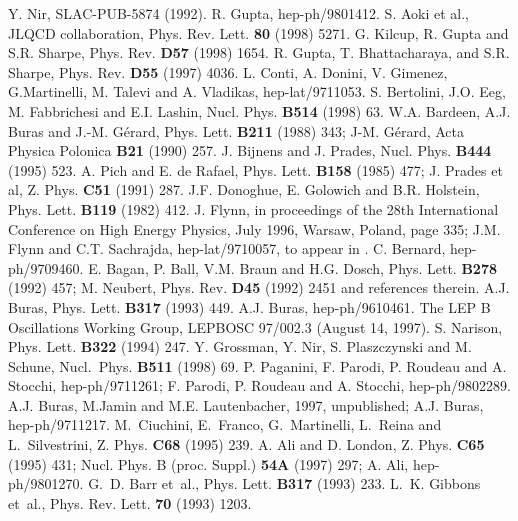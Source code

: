 \begin{thebibliography}{999}
Y. Nir, SLAC-PUB-5874 (1992).
R. Gupta, hep-ph/9801412.
S. Aoki et al., JLQCD collaboration, 
{ Phys. Rev. Lett.} {\bf 80} (1998) 5271. 
G. Kilcup, R. Gupta and S.R. Sharpe, 
{ Phys. Rev.} {\bf D57} (1998) 1654.
R. Gupta, T. Bhattacharaya, and S.R. Sharpe, 
{ Phys. Rev.} {\bf D55} (1997) 4036.
L. Conti, A. Donini, V. Gimenez, G.Martinelli, M. Talevi and
A. Vladikas, hep-lat/9711053.
S. Bertolini, J.O. Eeg, M. Fabbrichesi and E.I. Lashin,
{ Nucl. Phys.} {\bf B514} (1998) 63.
{W.A. Bardeen, A.J. Buras and J.-M. G\'erard,}
{ Phys. Lett.} {\bf B211} (1988) 343;
 {J-M. G\'erard,} { Acta Physica Polonica} {\bf B21} (1990) 257. 
{ J. Bijnens and J. Prades,} { Nucl. Phys.} {\bf B444} (1995) 523. 
{ A. Pich and E. de Rafael,} { Phys. Lett.} {\bf B158} (1985) 477;
{ J. Prades} {  et al,} { Z. Phys.}  {\bf C51} (1991) 287.
{ J.F. Donoghue, E. Golowich and B.R. Holstein,}
{ Phys. Lett.} {\bf B119} (1982) 412.
{ J. Flynn}, in proceedings of the 28th International Conference
on High Energy Physics, July 1996, Warsaw, Poland, page 335; 
 J.M. Flynn and C.T. Sachrajda, hep-lat/9710057, 
to appear in \cite{HFII}.
C. Bernard, hep-ph/9709460.
{ E. Bagan, P. Ball, V.M. Braun and H.G. Dosch},
{ Phys. Lett.} {\bf B278} (1992) 457;
{ M. Neubert}, { Phys. Rev.} {\bf D45} (1992) 2451 and references
therein.
A.J. Buras, { Phys. Lett.} {\bf B317} (1993) 449.
A.J. Buras, hep-ph/9610461.
The LEP B Oscillations Working Group, LEPBOSC 97/002.3 (August 14, 1997).
{S. Narison,}
{ Phys. Lett.} {\bf B322} (1994) 247.
Y. Grossman, Y. Nir, S. Plaszczynski and M. Schune,
{ Nucl.~Phys.} {\bf B511} (1998) 69.
P. Paganini, F. Parodi, P. Roudeau and A. Stocchi, hep-ph/9711261;
F. Parodi, P. Roudeau and A. Stocchi, hep-ph/9802289.
{ A.J. Buras, M.Jamin and M.E. Lautenbacher,} 1997, unpublished;
A.J. Buras, hep-ph/9711217.
{ M.~Ciuchini}, { E.~Franco}, { G.~Martinelli}, {L.~Reina
 and   L.~Silvestrini},
 { Z. Phys.} {\bf C68} (1995) 239.
{ A. Ali and D. London,}
{ Z. Phys.} {\bf C65} (1995) 431; 
{ Nucl. Phys. B} (proc. Suppl.) {\bf 54A} (1997) 297;
A. Ali, hep-ph/9801270.
{ G.~D. Barr} { et~al.},
{ Phys. Lett.} {\bf B317} (1993) 233.
{ L.~K. Gibbons} { et~al.},
{ Phys. Rev. Lett.} {\bf 70} (1993) 1203.

\end{thebibliography}
